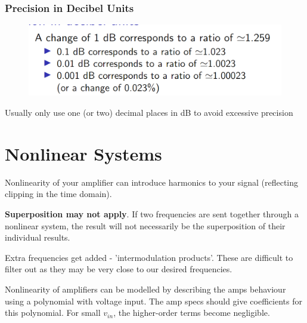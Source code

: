 \documentclass[12pt]{article}
\begin{document}
\subsubsection{Precision in Decibel Units}
\begin{figure}[h!]
    \centering
    \includegraphics[width=0.5\linewidth]{images/image7.png}
\end{figure}
Usually only use one (or two) decimal places in dB to avoid excessive precision

\begin{flushright}[Lecture on 3.2]\end{flushright}
\section{Nonlinear Systems}

Nonlinearity of your amplifier can introduce harmonics to your signal (reflecting clipping in the time domain).

\textbf{Superposition may not apply}. If two frequencies are sent together through a nonlinear system, the result will not necessarily be the superposition of their individual results.

Extra frequencies get added - 'intermodulation products'. These are difficult to filter out as they may be very close to our desired frequencies.

Nonlinearity of amplifiers can be modelled by describing the amps behaviour using a polynomial with voltage input. The amp specs should give coefficients for this polynomial.
For small $v_{in}$, the higher-order terms become negligible.
\end{document}
